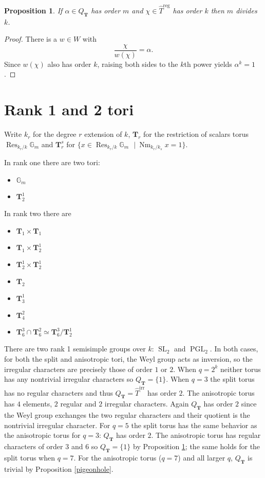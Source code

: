 \documentclass[11pt]{amsart}
\theoremstyle{plain}
\newtheorem{proposition}[theorem]{Proposition}
\theoremstyle{definition}
\DeclareMathOperator{\Nm}{Nm}
\DeclareMathOperator{\Res}{Res}
\DeclareMathOperator{\PGL}{PGL}
\DeclareMathOperator{\SL}{SL}
\newcommand{\st}{\ensuremath{\ \ \ \vert\ }}
\newcommand{\Gm}{\mathbb{G}_m}
\newcommand{\T}{\mathbf{T}}
\newcommand{\hatT}{\hat{T}}
\newcommand{\Threg}{\hatT^{\operatorname{reg}}}
\newcommand{\Thirr}{\hatT^{\operatorname{irr}}}
\begin{document}
\begin{proposition} \label{orderdiv}
If $\alpha \in Q_{\T}$ has order $m$ and $\chi \in \Threg$ has order $k$ then $m$ divides $k$.
\end{proposition}
\begin{proof}
There is a $w \in W$ with
$$\frac{\chi}{w(\chi)} = \alpha.$$
Since $w(\chi)$ also has order $k$, raising both sides to the $k$th power  yields $\alpha^k = 1$.
\end{proof}

\section{Rank 1 and 2 tori}

Write $k_r$ for the degree $r$ extension of $k$, $\T_r$ for the restriction of scalars torus $\Res_{k_r/k} \Gm$ and $\T_r^s$ for $\{x \in \Res_{k_r/k} \Gm \st \Nm_{k_r/k_s} x = 1\}$.

In rank one there are two tori:
\begin{itemize}
\item $\Gm$
\item $\T_2^1$
\end{itemize}

In rank two there are 
\begin{itemize}
\item $\T_1 \times \T_1$
\item $\T_1 \times \T_2^1$
\item $\T_2^1 \times \T_2^1$
\item $\T_2$
\item $\T_3^1$
\item $\T_4^2$
\item $\T_6^3 \cap \T_6^2 \simeq \T_6^3 / \T_2^1$
\end{itemize}

There are two rank 1 semisimple groups over $k$: $\SL_2$ and $\PGL_2$.  In both cases, for both the split and anisotropic tori, the Weyl group acts as inversion, so the irregular characters are precisely those of order $1$ or $2$.  When $q = 2^k$ neither torus has any nontrivial irregular characters so $Q_{\T} = \{1\}$.  When $q = 3$ the split torus has no regular characters and thus $Q_{\T} = \Thirr$ has order $2$.  The anisotropic torus has $4$ elements, $2$ regular and $2$ irregular characters.  Again $Q_{\T}$ has order $2$ since the Weyl group exchanges the two regular characters and their quotient is the nontrivial irregular character.  For $q = 5$ the split torus has the same behavior as the anisotropic torus for $q = 3$: $Q_{\T}$ has order $2$.  The anisotropic torus has regular characters of order $3$ and $6$ so $Q_{\T} = \{1\}$ by Proposition \ref{orderdiv}; the same holds for the split torus when $q = 7$.  For the anisotropic torus ($q = 7$) and all larger $q$, $Q_{\T}$ is trivial by Proposition \ref{pigeonhole}.
\end{document}
